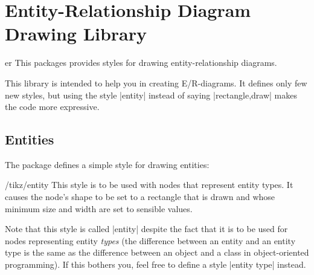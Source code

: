 %
%
%


\section{Entity-Relationship Diagram Drawing Library}

\begin{tikzlibrary}{er}
    This packages provides styles for drawing entity-relationship diagrams.
\end{tikzlibrary}
%
\begin{codeexample}
    \usetikzlibrary{er}
\end{codeexample}

This library is intended to help you in creating E/R-diagrams. It defines only
few new styles, but using the style |entity| instead of saying |rectangle,draw|
makes the code more expressive.


\subsection{Entities}

The package defines a simple style for drawing entities:

\begin{stylekey}{/tikz/entity}
    This style is to be used with nodes that represent entity types. It causes
    the node's shape to be set to a rectangle that is drawn and whose minimum
    size and width are set to sensible values.

    Note that this style is called |entity| despite the fact that it is to be
    used for nodes representing entity \emph{types} (the difference between an
    entity and an entity type is the same as the difference between an object
    and a class in object-oriented programming). If this bothers you, feel free
    to define a style |entity type| instead.
\begin{codeexample}[preamble={\usetikzlibrary{positioning}}]
\end{codeexample}
\end{stylekey}

